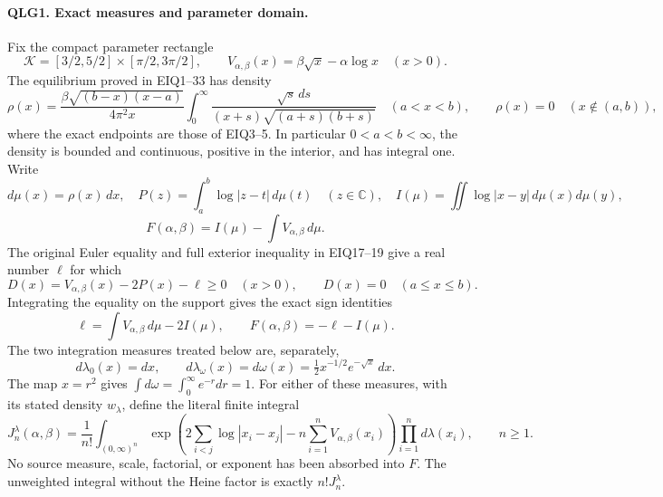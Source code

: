 \documentclass[11pt,a4paper]{article}
\begin{document}
\paragraph{QLG1. Exact measures and parameter domain.}
Fix the compact parameter rectangle
\[
 \mathcal K=[3/2,5/2]\times[\pi/2,3\pi/2],\qquad
 V_{\alpha,\beta}(x)=\beta\sqrt{x}-\alpha\log x\quad(x>0).
 \tag{QLG1}
\]
The equilibrium proved in EIQ1--33 has density
\[
 \rho(x)=\frac{\beta\sqrt{(b-x)(x-a)}}{4\pi^2x}
       \int_0^\infty
       \frac{\sqrt{s}\,ds}{(x+s)\sqrt{(a+s)(b+s)}}\quad(a<x<b),
 \qquad \rho(x)=0\quad(x\notin(a,b)),
 \tag{QLG2}
\]
where the exact endpoints are those of EIQ3--5. In particular
\(0<a<b<\infty\), the density is bounded and continuous, positive
in the interior, and has integral one. Write
\[
 d\mu(x)=\rho(x)\,dx,\quad
 P(z)=\int_a^b\log|z-t|\,d\mu(t)\quad(z\in\mathbb C),\quad
 I(\mu)=\iint\log|x-y|\,d\mu(x)d\mu(y),
\]
\[
 F(\alpha,\beta)=I(\mu)-\int V_{\alpha,\beta}\,d\mu.
 \tag{QLG3}
\]
The original Euler equality and full exterior inequality in EIQ17--19
give a real number \(\ell\) for which
\[
 D(x)=V_{\alpha,\beta}(x)-2P(x)-\ell\geq0\quad(x>0),
 \qquad D(x)=0\quad(a\leq x\leq b).
 \tag{QLG4}
\]
Integrating the equality on the support gives the exact sign identities
\[
 \ell=\int V_{\alpha,\beta}\,d\mu-2I(\mu),\qquad
 F(\alpha,\beta)=-\ell-I(\mu).
 \tag{QLG5}
\]
The two integration measures treated below are, separately,
\[
 d\lambda_0(x)=dx,\qquad
 d\lambda_\omega(x)=d\omega(x)=\tfrac12 x^{-1/2}e^{-\sqrt{x}}\,dx.
 \tag{QLG6}
\]
The map \(x=r^2\) gives \(\int d\omega=\int_0^\infty e^{-r}dr=1\).
For either of these measures, with its stated density \(w_\lambda\),
define the literal finite integral
\[
 J_n^\lambda(\alpha,\beta)=\frac1{n!}
 \int_{(0,\infty)^n}
 \exp\!\left(2\sum_{i<j}\log|x_i-x_j|
                 -n\sum_{i=1}^n V_{\alpha,\beta}(x_i)\right)
       \prod_{i=1}^n d\lambda(x_i),\qquad n\geq1.
 \tag{QLG7}
\]
No source measure, scale, factorial, or exponent has been absorbed into
\(F\). The unweighted integral without the Heine factor is exactly
\(n!J_n^\lambda\).
\end{document}
